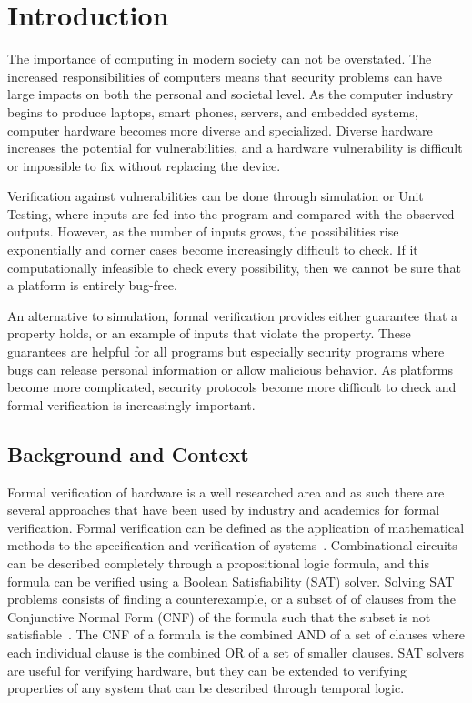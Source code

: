 \documentclass[../report.tex]{subfiles}
\begin{document}
\onehalfspacing

\section{Introduction}

The importance of computing in modern society can not be overstated. The increased responsibilities of computers means that security problems can have large impacts on both the personal and societal level.  As the computer industry begins to produce laptops, smart phones, servers, and embedded systems, computer hardware becomes more diverse and specialized. Diverse hardware increases the potential for vulnerabilities, and a hardware vulnerability is difficult or impossible
to fix without replacing the device. 

Verification against vulnerabilities can be done through simulation or Unit Testing, where inputs are fed into the program and compared with the observed outputs. However, as the number of inputs grows, the possibilities rise exponentially and corner cases become increasingly difficult to check. If it computationally infeasible to check every possibility, then we cannot be sure that a platform is entirely bug-free.

An alternative to simulation, formal verification provides either guarantee that a property holds, or an example of inputs that violate the property. These guarantees are helpful for all programs but especially security programs where bugs can release personal information or allow malicious behavior. As platforms become more complicated, security protocols become more difficult to check and formal verification is increasingly important.

\subsection{Background and Context}

Formal verification of hardware is a well researched area and as such there are several approaches that have been used by industry and academics for formal verification.
Formal verification can be defined as the application of mathematical methods to the specification and verification of systems~\cite{greenstreet}.
Combinational circuits can be described completely through a propositional logic formula, and this formula can be verified using a Boolean Satisfiability (SAT) solver.
Solving SAT problems consists of finding a counterexample, or a subset of of clauses from the Conjunctive Normal Form (CNF) of the formula such that the subset is not satisfiable~\cite{validating-sat}.
The CNF of a formula is the combined AND of a set of clauses where each individual clause is the combined OR of a set of smaller clauses.
SAT solvers are useful for verifying hardware, but they can be extended to verifying properties of any system that can be described through temporal logic.
\end{document}
